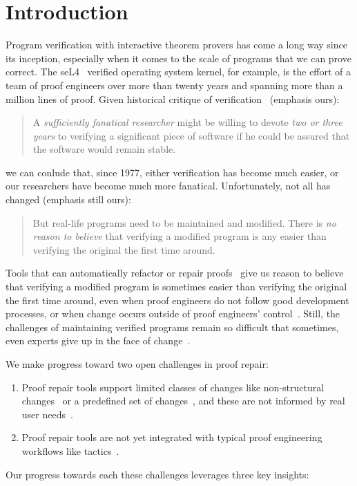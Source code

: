 \section{Introduction}

Program verification with interactive theorem provers has come a long way since its inception,
especially when it comes to the scale of programs that we can prove correct.
The seL4~\cite{Klein2009} verified operating system kernel, for example,
is the effort of a team of proof engineers over more than twenty years and spanning more than
a million lines of proof.
Given historical critique of verification~\cite{DeMillo1977} (emphasis ours):

\begin{quote}
A \textit{sufficiently fanatical researcher}
might be willing to devote \textit{two or 
three years} to verifying a significant 
piece of software if he could be 
assured that the software would remain stable.
\end{quote}
we can conlude that, since 1977, either verification has become much easier,
or our researchers have become much more fanatical. Unfortunately, not all has changed (emphasis still ours):

\begin{quote}
But real-life programs need to 
be maintained and modified. 
There is \textit{no reason to believe} that verifying a modified program is any 
easier than verifying the original the 
first time around.
\end{quote}
Tools that can automatically refactor or repair proofs~\cite{wibergh2019, WhitesidePhD, Dietrich2013, adams2015, Bourke12, Roe2016, robert2018, pumpkinpatch}
give us reason to believe that verifying a modified program is sometimes easier than verifying the original the first time
around, even when proof engineers do not follow good development processes,
or when change occurs outside of proof engineers' control~\cite{PGL-045}.
Still, the challenges of maintaining verified programs remain so difficult that
sometimes, even experts give up in the face of change~\cite{replica}.

We make progress toward two open challenges in proof repair:

\begin{enumerate}
\item Proof repair tools support limited classes of changes like non-structural changes~\cite{pumpkinpatch} or a predefined set
of changes~\cite{robert2018, wibergh2019}, and these are not informed by real user needs~\cite{replica}.
\item Proof repair tools are not yet integrated with typical proof engineering workflows like tactics~\cite{PGL-045, pumpkinpatch, robert2018}.
\end{enumerate}
Our progress towards each these challenges leverages three key insights: %

